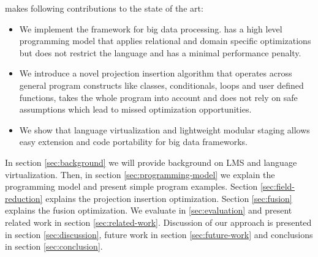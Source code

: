 \tool makes following contributions to the state of the art:    
\begin{itemize}

  \item We implement the \tool framework for big data processing. \tool has a high level programming model that applies relational and domain specific optimizations but does not restrict the language and has a minimal performance penalty.

  \item We introduce a novel projection insertion algorithm that operates across general program constructs like classes, conditionals, loops and user defined functions, takes the whole program into account and does not rely on safe assumptions which lead to missed optimization opportunities.  

  \item We show that language virtualization and lightweight modular staging allows easy extension and code portability for big data frameworks. 
\end{itemize} 

In section \ref{sec:background} we will provide background on LMS and language virtualization. Then, in section \ref{sec:programming-model} we explain the programming model and present simple program examples. Section \ref{sec:field-reduction} explains the projection insertion optimization. Section \ref{sec:fusion} explains the fusion optimization. We evaluate \tool in \ref{sec:evaluation} and present related work in section \ref{sec:related-work}. Discussion of our approach is presented in section \ref{sec:discussion}, future work in section \ref{sec:future-work} and conclusions in section \ref{sec:conclusion}.
